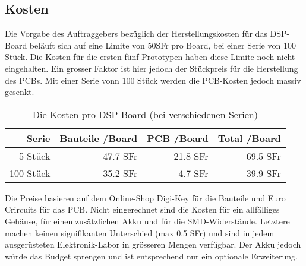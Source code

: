 \subsection{Kosten}
\label{sec:Kosten}

Die Vorgabe des Auftraggebers bezüglich der Herstellungskosten für das DSP-Board beläuft sich auf eine Limite von 50SFr pro Board, bei einer Serie von 100 Stück. Die Kosten für die ersten fünf Prototypen haben diese Limite noch nicht eingehalten. Ein grosser Faktor ist hier jedoch der Stückpreis für die Herstellung des PCBs. Mit einer Serie vonn 100 Stück werden die PCB-Kosten jedoch massiv gesenkt.

\begin{table}[H]
	\centering
	\begin{tabular}{|r|r|r|r|}
		\hline
		\textbf{Serie} & \textbf{Bauteile /Board}             & \textbf{PCB /Board} & \textbf{Total /Board} \\ \hline
		5 Stück              &           47.7 SFr      & 21.8 SFr & 69.5 SFr    \\ \hline
		100 Stück           & 35.2 SFr                       & 4.7 SFr  & 39.9 SFr    \\ \hline
	\end{tabular}
	\caption{Die Kosten pro DSP-Board (bei verschiedenen Serien)}
	\label{tab:kosten}
\end{table}

Die Preise basieren auf dem Online-Shop Digi-Key \cite{www:digikey} für die Bauteile und Euro Crircuits \cite{www:eurocircuits} für das PCB.
Nicht eingerechnet  sind die Kosten für ein allfälliges Gehäuse, für einen zusätzlichen Akku und für die SMD-Widerstände. Letztere machen keinen signifikanten Unterschied (max 0.5 SFr) und sind in jedem ausgerüsteten Elektronik-Labor in grösseren Mengen verfügbar. Der Akku jedoch würde das Budget sprengen und ist entsprechend nur ein optionale Erweiterung.